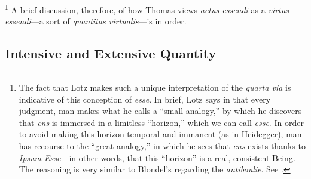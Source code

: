 %
\footnote{The fact that Lotz makes such a unique interpretation of the \emph{quarta via} is indicative of this conception of \emph{esse}. In brief, Lotz says in that every judgment, man makes what he calls a ``small analogy,'' by which he discovers that \emph{ens} is immersed in a limitless ``horizon,'' which we can call \emph{esse}. In order to avoid making this horizon temporal and immanent (as in Heidegger), man has recourse to the ``great analogy,'' in which he sees that \emph{ens} exists thanks to \emph{Ipsum Esse}---in other words, that this ``horizon'' is a real, consistent Being. The reasoning is very similar to Blondel's regarding the \emph{antiboulie}. See \cite[228--229]{contat:confronto}.}
%
A brief discussion, therefore, of how Thomas views \emph{actus essendi} as a \emph{virtus essendi}---a sort of \emph{quantitas virtualis}---is in order.

\subsection{Intensive and Extensive Quantity}
\label{sec:intensive-extensive}


